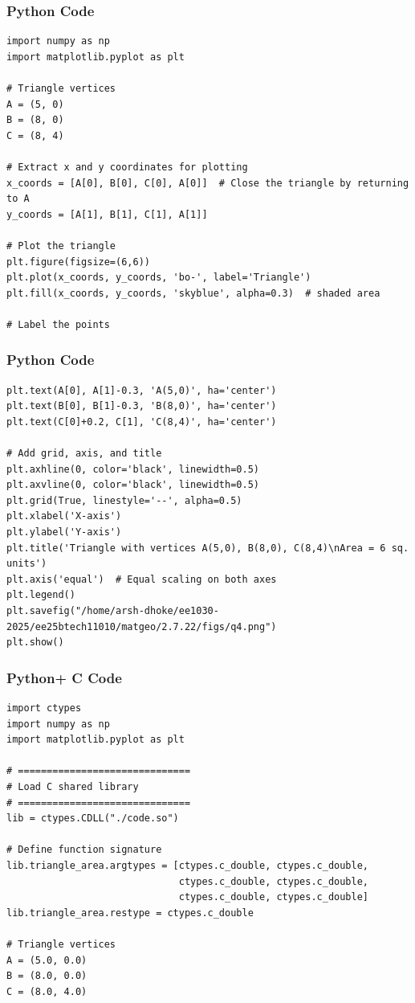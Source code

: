 \documentclass{beamer}
\begin{document}
\begin{frame}[fragile]
    \frametitle{Python Code}
\begin{lstlisting}
import numpy as np
import matplotlib.pyplot as plt

# Triangle vertices
A = (5, 0)
B = (8, 0)
C = (8, 4)

# Extract x and y coordinates for plotting
x_coords = [A[0], B[0], C[0], A[0]]  # Close the triangle by returning to A
y_coords = [A[1], B[1], C[1], A[1]]

# Plot the triangle
plt.figure(figsize=(6,6))
plt.plot(x_coords, y_coords, 'bo-', label='Triangle')
plt.fill(x_coords, y_coords, 'skyblue', alpha=0.3)  # shaded area

# Label the points

\end{lstlisting}
\end{frame}

\begin{frame}[fragile]
    \frametitle{Python Code}
\begin{lstlisting}
plt.text(A[0], A[1]-0.3, 'A(5,0)', ha='center')
plt.text(B[0], B[1]-0.3, 'B(8,0)', ha='center')
plt.text(C[0]+0.2, C[1], 'C(8,4)', ha='center')

# Add grid, axis, and title
plt.axhline(0, color='black', linewidth=0.5)
plt.axvline(0, color='black', linewidth=0.5)
plt.grid(True, linestyle='--', alpha=0.5)
plt.xlabel('X-axis')
plt.ylabel('Y-axis')
plt.title('Triangle with vertices A(5,0), B(8,0), C(8,4)\nArea = 6 sq. units')
plt.axis('equal')  # Equal scaling on both axes
plt.legend()
plt.savefig("/home/arsh-dhoke/ee1030-2025/ee25btech11010/matgeo/2.7.22/figs/q4.png")
plt.show()
\end{lstlisting}
\end{frame}

\begin{frame}[fragile]
    \frametitle{Python+ C Code}
\begin{lstlisting}
import ctypes
import numpy as np
import matplotlib.pyplot as plt

# ==============================
# Load C shared library
# ==============================
lib = ctypes.CDLL("./code.so")

# Define function signature
lib.triangle_area.argtypes = [ctypes.c_double, ctypes.c_double,
                              ctypes.c_double, ctypes.c_double,
                              ctypes.c_double, ctypes.c_double]
lib.triangle_area.restype = ctypes.c_double

# Triangle vertices
A = (5.0, 0.0)
B = (8.0, 0.0)
C = (8.0, 4.0)

\end{lstlisting}
\end{frame}
\end{document}

